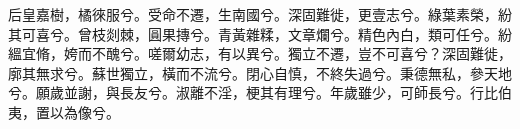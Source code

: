 
\begin{pinyinscope}
后皇嘉樹，橘徠服兮。受命不遷，生南國兮。深固難徙，更壹志兮。綠葉素榮，紛其可喜兮。曾枝剡棘，圓果摶兮。青黃雜糅，文章爛兮。精色內白，類可任兮。紛縕宜脩，姱而不醜兮。嗟爾幼志，有以異兮。獨立不遷，豈不可喜兮？深固難徙，廓其無求兮。蘇世獨立，橫而不流兮。閉心自慎，不終失過兮。秉德無私，參天地兮。願歲並謝，與長友兮。淑離不淫，梗其有理兮。年歲雖少，可師長兮。行比伯夷，置以為像兮。


\end{pinyinscope}